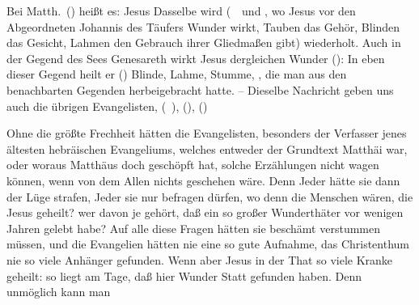 \begin{aufza}
\item Bei Matth.\ () heißt es: Jesus  Dasselbe wird (\ \ und , wo Jesus vor den Abgeordneten Johannis des Täufers Wunder wirkt, Tauben das Gehör, Blinden das Gesicht, Lahmen den Gebrauch ihrer Gliedmaßen gibt) wiederholt. Auch in der Gegend des Sees Genesareth wirkt Jesus dergleichen Wunder ():  In eben dieser Gegend heilt er () Blinde, Lahme, Stumme, \usw , die man aus den benachbarten Gegenden herbeigebracht hatte. -- Dieselbe Nachricht geben uns auch die übrigen Evangelisten,  (\ ),  (),  ()
\item Ohne die größte Frechheit hätten die Evangelisten, besonders der Verfasser jenes ältesten hebräischen Evangeliums, welches entweder der Grundtext Matthäi war, oder woraus Matthäus doch geschöpft hat, solche Erzählungen nicht wagen können, wenn von dem Allen nichts geschehen wäre. Denn Jeder hätte sie dann der Lüge strafen, Jeder sie nur befragen dürfen, wo denn die Menschen wären, die Jesus geheilt? wer davon je gehört, daß ein so großer Wunderthäter vor wenigen Jahren gelebt habe? Auf alle diese Fragen hätten sie beschämt verstummen müssen, und die Evangelien hätten nie eine so gute Aufnahme, das Christenthum nie so viele Anhänger gefunden. Wenn aber Jesus in der That so viele Kranke geheilt: so liegt am Tage, daß hier Wunder Statt gefunden haben. Denn unmöglich kann man
\begin{aufzb}

\end{aufzb}
\end{aufza}
